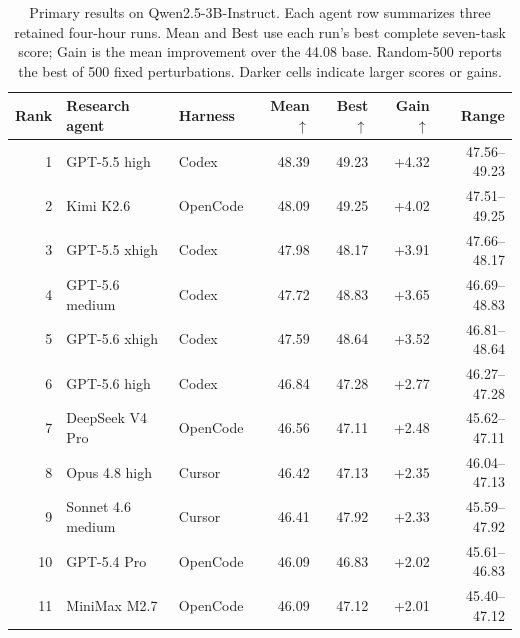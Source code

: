 \documentclass{article}
\begin{document}
\begin{table}[t]
\centering
\small
\setlength{\tabcolsep}{4.2pt}
\renewcommand{\arraystretch}{1.10}
\caption{Primary results on Qwen2.5-3B-Instruct. Each agent row summarizes three
retained four-hour runs. Mean and Best use each run's best complete seven-task score;
Gain is the mean improvement over the 44.08 base. Random-500 reports the best of 500 fixed
perturbations. Darker cells indicate larger scores or gains.}
\label{tab:main}
\begin{tabular*}{\linewidth}{@{\extracolsep{\fill}}rllrrrr}
\toprule
\rowcolor{tableheader}
Rank & Research agent & Harness & Mean $\uparrow$ & Best $\uparrow$ & Gain $\uparrow$ & Range \\
\midrule
\textcolor{goldmedal}{1} & GPT-5.5 high & Codex & \cellcolor{perf70}48.39 & \cellcolor{perf80}49.23 & \cellcolor{perf80}+4.32 & 47.56--49.23 \\
\textcolor{silvermedal}{2} & Kimi K2.6 & OpenCode & \cellcolor{perf70}48.09 & \cellcolor{perf80}49.25 & \cellcolor{perf80}+4.02 & 47.51--49.25 \\
\textcolor{bronzemedal}{3} & GPT-5.5 xhigh & Codex & \cellcolor{perf60}47.98 & \cellcolor{perf70}48.17 & \cellcolor{perf70}+3.91 & 47.66--48.17 \\
4 & GPT-5.6 medium & Codex & \cellcolor{perf60}47.72 & \cellcolor{perf80}48.83 & \cellcolor{perf70}+3.65 & 46.69--48.83 \\
5 & GPT-5.6 xhigh & Codex & \cellcolor{perf60}47.59 & \cellcolor{perf80}48.64 & \cellcolor{perf70}+3.52 & 46.81--48.64 \\
6 & GPT-5.6 high & Codex & \cellcolor{perf40}46.84 & \cellcolor{perf50}47.28 & \cellcolor{perf50}+2.77 & 46.27--47.28 \\
7 & DeepSeek V4 Pro & OpenCode & \cellcolor{perf40}46.56 & \cellcolor{perf50}47.11 & \cellcolor{perf40}+2.48 & 45.62--47.11 \\
8 & Opus 4.8 high & Cursor & \cellcolor{perf30}46.42 & \cellcolor{perf50}47.13 & \cellcolor{perf40}+2.35 & 46.04--47.13 \\
9 & Sonnet 4.6 medium & Cursor & \cellcolor{perf30}46.41 & \cellcolor{perf60}47.92 & \cellcolor{perf40}+2.33 & 45.59--47.92 \\
10 & GPT-5.4 Pro & OpenCode & \cellcolor{perf30}46.09 & \cellcolor{perf40}46.83 & \cellcolor{perf40}+2.02 & 45.61--46.83 \\
11 & MiniMax M2.7 & OpenCode & \cellcolor{perf30}46.09 & \cellcolor{perf50}47.12 & \cellcolor{perf40}+2.01 & 45.40--47.12 \\

\end{tabular*}
\end{table}
\end{document}
